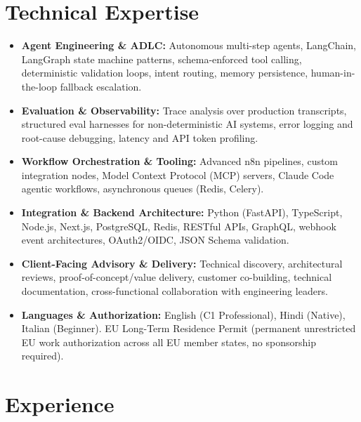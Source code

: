 \documentclass[10pt,a4paper]{article}
\begin{document}
\section{Technical Expertise}
\begin{itemize}
  \item \textbf{Agent Engineering \& ADLC:} Autonomous multi-step agents, LangChain, LangGraph state machine patterns, schema-enforced tool calling, deterministic validation loops, intent routing, memory persistence, human-in-the-loop fallback escalation.
  \item \textbf{Evaluation \& Observability:} Trace analysis over production transcripts, structured eval harnesses for non-deterministic AI systems, error logging and root-cause debugging, latency and API token profiling.
  \item \textbf{Workflow Orchestration \& Tooling:} Advanced n8n pipelines, custom integration nodes, Model Context Protocol (MCP) servers, Claude Code agentic workflows, asynchronous queues (Redis, Celery).
  \item \textbf{Integration \& Backend Architecture:} Python (FastAPI), TypeScript, Node.js, Next.js, PostgreSQL, Redis, RESTful APIs, GraphQL, webhook event architectures, OAuth2/OIDC, JSON Schema validation.
  \item \textbf{Client-Facing Advisory \& Delivery:} Technical discovery, architectural reviews, proof-of-concept/value delivery, customer co-building, technical documentation, cross-functional collaboration with engineering leaders.
  \item \textbf{Languages \& Authorization:} English (C1 Professional), Hindi (Native), Italian (Beginner). EU Long-Term Residence Permit (permanent unrestricted EU work authorization across all EU member states, no sponsorship required).
\end{itemize}

\section{Experience}
\end{document}

